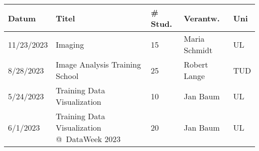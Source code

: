 \begin{longtable}{|p{}|p{}|p{}|p{}|p{}|}
\hline
Datum & Titel & # Stud. & Verantw. & Uni \\ \hline
\hline
11/23/2023 & Imaging & 15 & Maria Schmidt & UL \\ \hline
8/28/2023 & Image Analysis Training School & 25 & Robert Lange & TUD \\ \hline
5/24/2023 & Training Data Visualization & 10 & Jan Baum & UL \\ \hline
6/1/2023 & Training Data Visualization @ DataWeek 2023 & 20 & Jan Baum & UL \\ \hline
\hline
\end{longtable}
